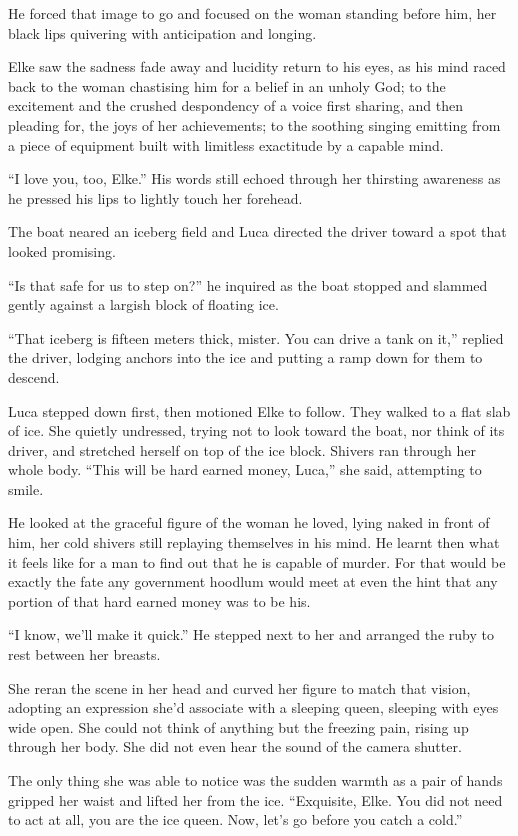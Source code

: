 He forced that image to go and focused on the woman standing before him, her black lips quivering with anticipation and longing.

Elke saw the sadness fade away and lucidity return to his eyes, as his mind raced back to the woman chastising him for a belief in an unholy God; to the excitement and the crushed despondency of a voice first sharing, and then pleading for, the joys of her achievements; to the soothing singing emitting from a piece of equipment built with limitless exactitude by a capable mind.

``I love you, too, Elke.'' His words still echoed through her thirsting awareness as he pressed his lips to lightly touch her forehead.

The boat neared an iceberg field and Luca directed the driver toward a spot that looked promising.

``Is that safe for us to step on?'' he inquired as the boat stopped and slammed gently against a largish block of floating ice.

``That iceberg is fifteen meters thick, mister. You can drive a tank on it,'' replied the driver, lodging anchors into the ice and putting a ramp down for them to descend.

Luca stepped down first, then motioned Elke to follow. They walked to a flat slab of ice. She quietly undressed, trying not to look toward the boat, nor think of its driver, and stretched herself on top of the ice block. Shivers ran through her whole body. ``This will be hard earned money, Luca,'' she said, attempting to smile.

He looked at the graceful figure of the woman he loved, lying naked in front of him, her cold shivers still replaying themselves in his mind. He learnt then what it feels like for a man to find out that he is capable of murder. For that would be exactly the fate any government hoodlum would meet at even the hint that any portion of that hard earned money was to be his.

``I know, we'll make it quick.'' He stepped next to her and arranged the ruby to rest between her breasts.

She reran the scene in her head and curved her figure to match that vision, adopting an expression she'd associate with a sleeping queen, sleeping with eyes wide open. She could not think of anything but the freezing pain, rising up through her body. She did not even hear the sound of the camera shutter.

The only thing she was able to notice was the sudden warmth as a pair of hands gripped her waist and lifted her from the ice. ``Exquisite, Elke. You did not need to act at all, you are the ice queen. Now, let's go before you catch a cold.''

